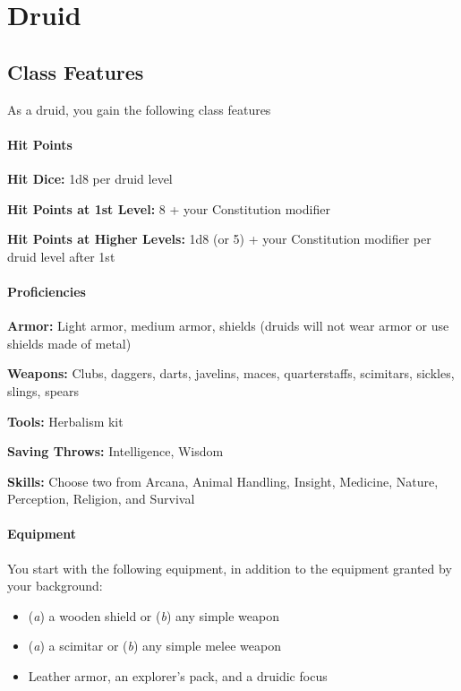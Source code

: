 \documentclass[
]{article}
\date{}
\providecommand{\tightlist}{%
  \setlength{\itemsep}{0pt}\setlength{\parskip}{0pt}}
\begin{document}
\hypertarget{druid}{%
\section{Druid}\label{druid}}

\hypertarget{class-features}{%
\subsection{Class Features}\label{class-features}}

As a druid, you gain the following class features

\hypertarget{hit-points}{%
\paragraph{Hit Points}\label{hit-points}}

\textbf{Hit Dice:} 1d8 per druid level

\textbf{Hit Points at 1st Level:} 8 + your Constitution modifier

\textbf{Hit Points at Higher Levels:} 1d8 (or 5) + your Constitution
modifier per druid level after 1st

\hypertarget{proficiencies}{%
\paragraph{Proficiencies}\label{proficiencies}}

\textbf{Armor:} Light armor, medium armor, shields (druids will not wear
armor or use shields made of metal)

\textbf{Weapons:} Clubs, daggers, darts, javelins, maces, quarterstaffs,
scimitars, sickles, slings, spears

\textbf{Tools:} Herbalism kit

\textbf{Saving Throws:} Intelligence, Wisdom

\textbf{Skills:} Choose two from Arcana, Animal Handling, Insight,
Medicine, Nature, Perception, Religion, and Survival

\hypertarget{equipment}{%
\paragraph{Equipment}\label{equipment}}

You start with the following equipment, in addition to the equipment
granted by your background:

\begin{itemize}
\tightlist
\item
  (\emph{a}) a wooden shield or (\emph{b}) any simple weapon
\item
  (\emph{a}) a scimitar or (\emph{b}) any simple melee weapon
\item
  Leather armor, an explorer's pack, and a druidic focus
\end{itemize}
\end{document}
